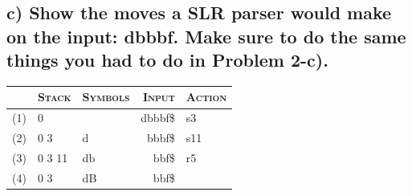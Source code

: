 \subsection{c) Show the moves a SLR parser would make on the input: \textbf{dbbbf}. Make sure to do the same things you had to do in Problem 2-c).}


\begin{table}[H]
\centering
\begin{tabular}{r|l|l|r|l} %
	\hline \hline
	& \textsc{Stack} & \textsc{Symbols} & \textsc{Input} & \textsc{Action} \\ \hline
	(1)  & 0        &               & dbbbf\$   & s3	\\
	(2)	 & 0 3		& d				& bbbf\$	& s11	\\
	(3)	 & 0 3 11	& db 			& bbf\$		& r5	\\
	(4)	 & 0 3		& dB			& bbf\$		& 
\end{tabular}
\end{table}
